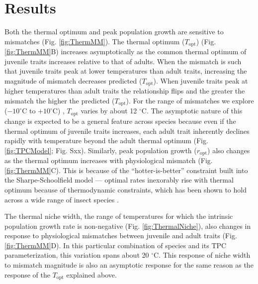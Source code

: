 \section*{Results}

Both the thermal optimum and peak population growth are sensitive to mismatches (Fig. \ref{fig:ThermMM}). The thermal optimum ($T_\text{opt}$) (Fig. \ref{fig:ThermMM}B) increases asymptotically as the common thermal optimum of juvenile traits increases relative to that of adults. When the mismatch is such that juvenile traits peak at lower temperatures than adult traits, increasing the magnitude of mismatch decreases predicted ($T_\text{opt}$). When juvenile traits peak at higher temperatures than adult traits the relationship flips and the greater the mismatch the higher the predicted ($T_\text{opt}$). For the range of mismatches we explore ($-10^\circ$C to $+10^\circ$C) , $T_\text{opt}$ varies by about 12 $^\circ$C. The asymptotic nature of this change is expected to be a general feature across species because even if the thermal optimum of juvenile traits increases, each adult trait inherently declines rapidly with temperature beyond the adult thermal optimum (Fig. \ref{fig:TPCModel}; Fig. Sxx). Similarly, peak population growth ($r_\text{opt}$) also changes as the thermal optimum increases with physiological mismatch (Fig. \ref{fig:ThermMM}C). This is because of the ``hotter-is-better'' constraint built into the Sharpe-Schoolfield model \citep{Schoolfield1981} --- optimal rates inexorably rise with thermal optimum because of thermodynamic constraints, which has been shown to hold across a wide range of insect species \citep{Frazier2006}. 

The thermal niche width, the range of temperatures for which the intrinsic population growth rate is non-negative (Fig. \ref{fig:ThermalNiche}), also changes in response to physiological mismatches between juvenile and adult traits (Fig. \ref{fig:ThermMM}D). In this particular combination of species and its TPC parameterization, this variation spans about 20 $^\circ$C. This response of niche width to mismatch magnitude is also an asymptotic response for the same reason as the response of the $T_\text{opt}$ explained above. 

